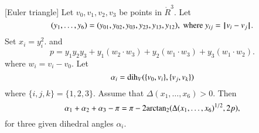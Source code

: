\begin{lemma}[Euler triangle]\label{lemma:euler}
Let $v_0,v_1,v_2,v_3$ be points in $\ring{R}^3$. 
Let 
  $$(y_1,\ldots,y_6) =(y_{01},y_{02},y_{03},y_{23},y_{13},y_{12}),
   \text{ where } y_{ij}={\hskip0.1em|\hskip-0.15em|\hskip0.1em}v_i - v_j{\hskip0.1em|\hskip-0.15em|\hskip0.1em}.$$
Set
$x_i = y_i^2$.   
and
    $$
    p = y_1 y_2 y_3 + y_1 (w_2\cdot w_3) + y_2 (w_1\cdot w_3) + y_3
    (w_1\cdot w_2).
    $$
%
where $w_i = v_i- v_0$.
Let $$\alpha_i =\operatorname{dih}_V(\{v_0,v_i\},\{v_j,v_k\})$$
where $\{i,j,k\}=\{1,2,3\}$.
Assume that $\Delta(x_1,\ldots,x_6)>0$. 
Then
    $$
    \alpha_1+\alpha_2+\alpha_3 - \pi
     = {\pi} - 2{\operatorname{arctan_2}}({\Delta(x_1,\ldots,x_6)^{1/2}},{2 p}),
    $$
for three given dihedral angles $\alpha_i$.
\end{lemma}
%

